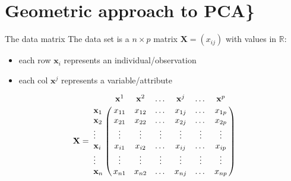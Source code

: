 \documentclass[
  11pt,
  ignorenonframetext,
  notheorems]{beamer}
\author{}
\date{}
\providecommand{\tightlist}{%
  \setlength{\itemsep}{0pt}\setlength{\parskip}{0pt}}\usepackage{longtable,booktabs,array}
\newcommand{\Rset}{\mathbb{R}}
\newcommand{\1}{\mathbf{1}}
\newcommand{\bx}{\mathbf{x}}
\newcommand{\bX}{\mathbf{X}}
\theoremstyle{plain}
\theoremstyle{remark}
\begin{document}
\ifdefined\Shaded\renewenvironment{Shaded}{\begin{tcolorbox}[interior hidden, frame hidden, boxrule=0pt, sharp corners, breakable, borderline west={3pt}{0pt}{shadecolor}, enhanced]}{\end{tcolorbox}}\fi

\hypertarget{geometric-approach-to-pca}{%
\section{Geometric approach to PCA\}}\label{geometric-approach-to-pca}}

\begin{frame}[fragile]{The data matrix}
\protect\hypertarget{the-data-matrix}{}
The data set is a \(n\times p\) matrix \(\bX = (x_{ij})\) with values in
\(\Rset\):

\begin{itemize}
\tightlist
\item
  each row \(\bx_i\) represents an individual/observation
\item
  each col \(\bx^j\) represents a variable/attribute
\end{itemize}

\begin{equation*}
  \bX = \bordermatrix{%
           ~ & \bx^1  & \bx^2  &  \dots & \bx^j   & \dots & \bx^p  \cr
    \bx_1  & x_{11} & x_{12} &  \dots & x_{1j} & \dots & x_{1p}  \cr
    \bx_2  & x_{21} & x_{22} &  \dots & x_{2j} & \dots & x_{2p}  \cr
    \vdots & \vdots & \vdots & \vdots & \vdots & \vdots & \vdots  \cr
    \bx_i  & x_{i1} & x_{i2} &  \dots & x_{ij} & \dots & x_{ip} \cr
    \vdots & \vdots & \vdots & \vdots & \vdots & \vdots & \vdots  \cr
    \bx_n  & x_{n1} & x_{n2} &  \dots & x_{nj} & \dots & x_{np} \cr
  }
\end{equation*}
\end{frame}
\end{document}
